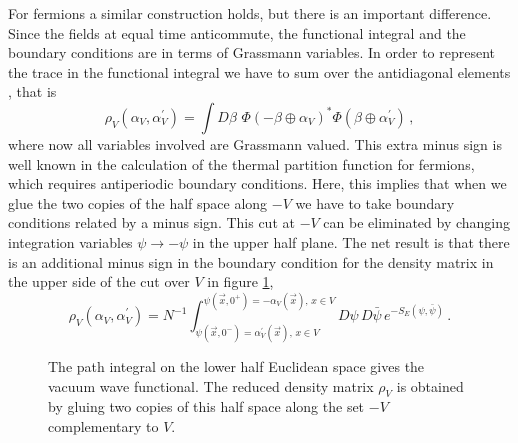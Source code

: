 \documentclass[a4paper]{article}
\begin{document}
For fermions a similar construction holds, but there is an important difference. Since the fields at equal time anticommute, the functional integral and the boundary conditions are in terms of  Grassmann variables. In order to represent the trace in the functional integral we have to sum over the antidiagonal elements \cite{klein}, that is  
\begin{equation}
\rho_V(\alpha_{V},\alpha^\prime_{V})=\int D\beta\,\, \Phi(-\beta \oplus \alpha_{V})^* \Phi(\beta\oplus \alpha^\prime_{V})\,,
\end{equation}
where now all variables involved are Grassmann valued. This extra minus sign is well known in the calculation of the thermal partition function for fermions, which requires antiperiodic boundary conditions.  Here, this implies that when we glue the two copies of the half space along $-V$ we have to take boundary conditions related by a minus sign. This cut at $-V$ can be eliminated by changing integration variables $\psi\rightarrow -\psi$ in the upper half plane. The net result is that there is an additional minus sign in the boundary condition for the density matrix in the upper side of the cut over $V$ in figure \ref{figu1},  
\begin{equation}
\rho_V(\alpha_{V},\alpha^\prime_{V})=N^{-1}\int_{\psi(\vec{x},0^-)= \alpha^\prime_V(\vec{x}),\, x\in V }^{\psi(\vec{x},0^+)=-\alpha_V(\vec{x}),\,x\in V} D\psi\,D\bar{\psi}\, e^{-S_E(\psi,\bar{\psi})}\,. 
\end{equation}

\begin{figure} [tbp]
\centering
\leavevmode
\epsfysize=4cm
\bigskip
{}
\caption{The path integral on the lower half Euclidean space gives the vacuum wave functional. The reduced density matrix $\rho_V$ is obtained by gluing two copies of this half space along the set $-V$ complementary to $V$.}
\label{figu1}
\end{figure}
\end{document}
